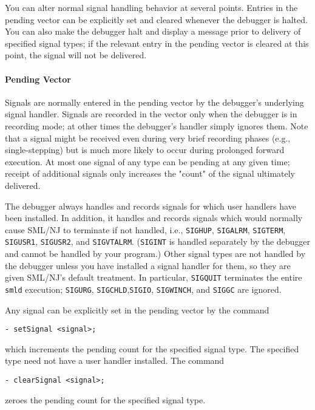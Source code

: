 You can alter normal signal handling behavior at several points.
Entries in the pending vector can be explicitly set and cleared whenever
the debugger is halted.
You can also make the debugger halt and
display a message prior to delivery of specified signal types; 
if the relevant entry in the pending vector is cleared at this point, 
the signal will not be delivered.

\paragraph{Pending Vector}
Signals are normally entered in the pending vector by the debugger's
underlying signal handler. Signals are recorded in the vector only
when the debugger is in recording mode; at other times the debugger's
handler simply ignores them.
Note that a signal might be received even during very brief
recording phases (e.g., single-stepping) but is much more likely
to occur during prolonged forward execution.  
At most one signal of any type can be pending at any given time; 
receipt of additional signals only increases the "count" of the 
signal ultimately delivered. 

The debugger always handles and 
records signals for which user handlers have been installed.  
In addition, it handles and records 
signals which would normally cause SML/NJ to terminate if not handled, i.e.,
{\tt SIGHUP}, {\tt SIGALRM}, {\tt SIGTERM}, {\tt SIGUSR1}, 
{\tt SIGUSR2}, and {\tt SIGVTALRM}. 
({\tt SIGINT} is handled separately by the debugger and cannot be handled by
your program.) Other signal types are not handled by 
the debugger unless you have installed a signal handler for them, so they are
given SML/NJ's default treatment.  In particular, {\tt SIGQUIT} terminates
the entire {\tt smld} execution; {\tt SIGURG}, {\tt SIGCHLD},{\tt SIGIO}, 
{\tt SIGWINCH}, and {\tt SIGGC} are ignored.

Any signal can be explicitly set in the pending vector by the command
\begin{verbatim}
- setSignal <signal>;
\end{verbatim}
which increments the pending count for the specified signal type.
The specified type need not have a user handler installed.
The command
\begin{verbatim}
- clearSignal <signal>;
\end{verbatim}
zeroes the pending count for the specified signal type.

